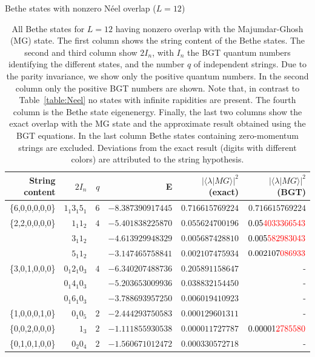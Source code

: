 \documentclass[11pt]{iopart}
\begin{document}
\begin{table}[ht]
\scriptsize
\centering
Bethe states with nonzero N\'eel overlap ($L=12$)\\[1ex]
\begin{tabular}{rrrrrr}
\toprule
String content & $2I_n$ & $q$ & E & $|\langle\lambda|MG\rangle|^2$ (exact) & $|\langle\lambda|MG\rangle|^2$ (BGT) \\[0.3em]
\toprule
\{6,0,0,0,0,0\} &$1_1 3_1 5_1$ & $6$ & $-8.387390917445$ & $0.716615769224$ & $0.716615769224$\\
\midrule
\{2,2,0,0,0,0\} &$1_1 1_2$ & $4$ & $-5.401838225870$ & $0.055624700196$ & $0.05{\color{red}4033366543}$\\  
&$3_1 1_2 $ & & $-4.613929948329$ & $0.005687428810$ & $0.005{\color{red}582983043}$\\
&$5_1 1_2 $ &  & $-3.147465758841$ & $0.002107475934$ & $0.002107{\color{red}086933}$\\
\midrule
\{3,0,1,0,0,0\} &$0_1 2_1 0_3$ & $4$ & $-6.340207488736$ & $0.205891158647$ & -\\
  &$0_1 4_1 0_3$ & & $-5.203653009936$ & $0.038832154450$ & - \\
  &$0_1 6_1 0_3$ & & $-3.788693957250$ & $0.006019410923$ & - \\
\midrule
\{1,0,0,0,1,0\} &$0_1 0_5$ & $2$ & $-2.444293750583$ & $0.000129601311$ & - \\
\midrule
\{0,0,2,0,0,0\} &$1_3$ & $2$ & $-1.111855930538$ & $0.000011727787$ & $0.00001{\color{red}2785580}$\\
\midrule
\{0,1,0,1,0,0\} &$0_2 0_4$ & $2$ &  $-1.560671012472$ & $0.000330572718$ & - \\
\bottomrule
\end{tabular}
\caption{All Bethe states for $L=12$ having nonzero overlap with the  Majumdar-Ghosh (MG) 
 state. The first column shows the string content of the Bethe states. The second and third column show 
 $2I_n$, with $I_n$ the BGT quantum numbers identifying the different states, and the number $q$ 
 of independent strings. Due to the parity invariance, we show only the positive quantum numbers. 
 In the second column only the positive BGT numbers are shown. Note that, in 
 contrast to Table~\ref{table:Neel} no states with infinite rapidities are present. The fourth column 
 is the Bethe state eigenenergy. Finally, the last two columns show the exact overlap with the MG state 
 and the approximate result obtained using the BGT equations. In the last column Bethe states containing 
 zero-momentum strings are excluded. Deviations from the exact result (digits with different colors) 
 are attributed to the string hypothesis. 
}
\label{table:mg}
\end{table}
\end{document}
